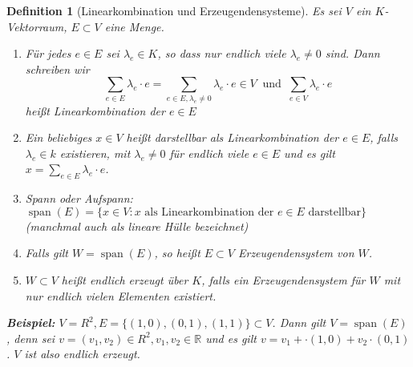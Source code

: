 \documentclass{report}
\newcommand{\lb}{\lambda}
\newcommand{\R}{\mathbb{R}}
\DeclareMathOperator{\Span}{span}
\theoremstyle{customrem}
\theoremstyle{customdef}
\newtheorem{definition}{Definition}[chapter]
\begin{document}
	\begin{definition}[Linearkombination und Erzeugendensysteme]
		Es sei $V$ ein $K$-Vektorraum, $E \subset V$ eine Menge.
		
		\begin{enumerate}
			\item Für jedes $e \in E$ sei $\lb_e \in K$, so dass nur endlich viele $\lb_e \neq 0$ sind. Dann schreiben wir $$\sum_{e \in E}\lb_e \cdot e = \sum_{e\in E, \lb_e \neq 0} \lb_e \cdot e \in V\ \text{ und }\ \sum_{e \in V} \lb_e \cdot e$$ heißt Linearkombination der $e \in E$
			\item Ein beliebiges $x \in V$ heißt darstellbar als Linearkombination der $e \in E$, falls $\lb_e \in k$ existieren, mit $\lb_e \neq 0$ für endlich viele $e \in E$ und es gilt $x = \sum_{e \in E}\lb_e \cdot e$.
			\item Spann oder Aufspann: $\Span(E) = \{x \in V : x \text{ als Linearkombination der } e \in E \text{ darstellbar}\}$ (manchmal auch als lineare Hülle bezeichnet)
			\item Falls gilt $W = \Span(E)$, so heißt $E \subset V$ Erzeugendensystem von $W$.
			\item $W \subset V$ heißt endlich erzeugt über $K$, falls ein Erzeugendensystem für $W$ mit nur endlich vielen Elementen existiert.
		\end{enumerate}
		\textbf{Beispiel: } 
		$V = R^2, E = \{(1, 0), (0, 1), (1, 1)\} \subset V$. Dann gilt $V = \Span(E)$, denn sei $v = (v_1, v_2) \in R^2, v_1, v_2 \in \R$ und es gilt $v = v_1 + \cdot (1, 0) + v_2 \cdot (0, 1)$. $V$ ist also endlich erzeugt.
		
	\end{definition}
	
\end{document}
